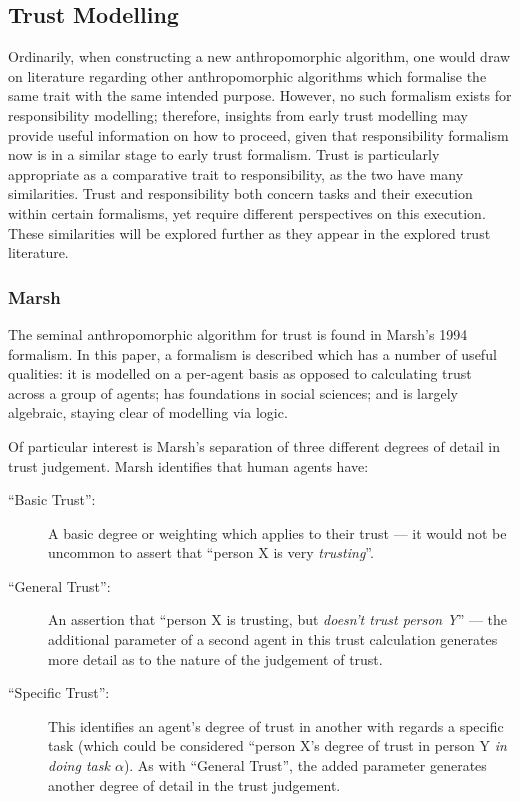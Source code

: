 \subsection{Trust Modelling}\label{subsec:trust_modelling_lit}
Ordinarily, when constructing a new anthropomorphic algorithm, one would draw on literature regarding other anthropomorphic algorithms which formalise the same trait with the same intended purpose. However, no such formalism exists for responsibility modelling; therefore, insights from early trust modelling may provide useful information on how to proceed, given that responsibility formalism now is in a similar stage to early trust formalism. Trust is particularly appropriate as a comparative trait to responsibility, as the two have many similarities. Trust and responsibility both concern tasks and their execution within certain formalisms, yet require different perspectives on this execution. These similarities will be explored further as they appear in the explored trust literature.\par

\subsubsection{Marsh~\cite{Marsh1994FormalisingConcept}}
The seminal anthropomorphic algorithm for trust is found in Marsh's 1994 formalism\cite{Marsh1994FormalisingConcept}. In this paper, a formalism is described which has a number of useful qualities: it is modelled on a per-agent basis as opposed to calculating trust across a group of agents; has foundations in social sciences; and is largely algebraic, staying clear of modelling via logic.

Of particular interest is Marsh's separation of three different degrees of detail in trust judgement. Marsh identifies that human agents have:

\begin{description}
    \item [``Basic Trust'': ] A basic degree or weighting which applies to their trust --- it would not be uncommon to assert that ``person X is very \emph{trusting}''.
    \item [``General Trust'': ] An assertion that ``person X is trusting, but \emph{doesn't trust person Y}'' --- the additional parameter of a second agent in this trust calculation generates more detail as to the nature of the judgement of trust.
    \item [``Specific Trust'': ] This identifies an agent's degree of trust in another with regards a specific task (which could be considered ``person X's degree of trust in person Y \emph{in doing task \(\alpha\)}). As with ``General Trust'', the added parameter generates another degree of detail in the trust judgement.
\end{description}

